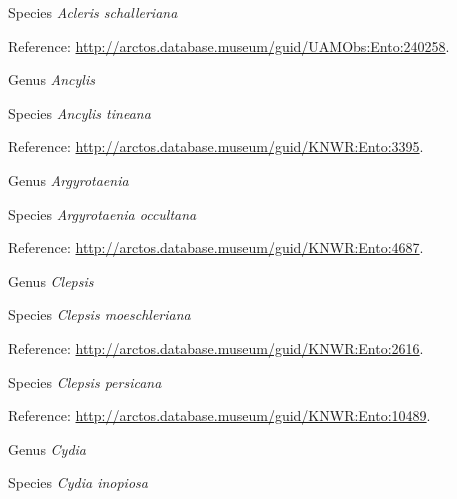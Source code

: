 \documentclass[9pt, article]{memoir}
\begin{document}
\begin{multicols}{2}
\vspace{6pt}\noindent\hspace{36pt}Species \textit{Acleris schalleriana}


\vspace{6pt}Reference: 
\url{http://arctos.database.museum/guid/UAMObs:Ento:240258}.

\vspace{6pt}\noindent\hspace{30pt}Genus \textit{Ancylis}


\vspace{6pt}\noindent\hspace{36pt}Species \textit{Ancylis tineana}


\vspace{6pt}Reference: 
\url{http://arctos.database.museum/guid/KNWR:Ento:3395}.

\vspace{6pt}\noindent\hspace{30pt}Genus \textit{Argyrotaenia}


\vspace{6pt}\noindent\hspace{36pt}Species \textit{Argyrotaenia occultana}


\vspace{6pt}Reference: 
\url{http://arctos.database.museum/guid/KNWR:Ento:4687}.

\vspace{6pt}\noindent\hspace{30pt}Genus \textit{Clepsis}


\vspace{6pt}\noindent\hspace{36pt}Species \textit{Clepsis moeschleriana}


\vspace{6pt}Reference: 
\url{http://arctos.database.museum/guid/KNWR:Ento:2616}.

\vspace{6pt}\noindent\hspace{36pt}Species \textit{Clepsis persicana}


\vspace{6pt}Reference: 
\url{http://arctos.database.museum/guid/KNWR:Ento:10489}.

\vspace{6pt}\noindent\hspace{30pt}Genus \textit{Cydia}


\vspace{6pt}\noindent\hspace{36pt}Species \textit{Cydia inopiosa}



\end{multicols}
\end{document}
